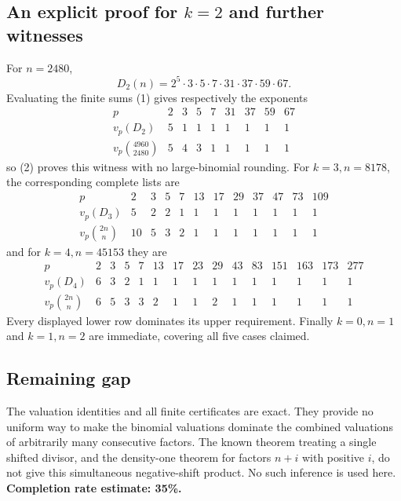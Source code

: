 \subsection*{An explicit proof for $k=2$ and further witnesses}
For $n=2480$,
\[
 D_2(n)=2^5\cdot3\cdot5\cdot7\cdot31\cdot37\cdot59\cdot67.
\]
Evaluating the finite sums (1) gives respectively the exponents
\[
 \begin{array}{c|rrrrrrrr}
 p&2&3&5&7&31&37&59&67\\\hline
 v_p(D_2)&5&1&1&1&1&1&1&1\\
 v_p\binom{4960}{2480}&5&4&3&1&1&1&1&1
 \end{array}
\]
so (2) proves this witness with no large-binomial rounding.
For $k=3,n=8178$, the corresponding complete lists are
\[
 \begin{array}{c|rrrrrrrrrrr}
 p&2&3&5&7&13&17&29&37&47&73&109\\\hline
 v_p(D_3)&5&2&2&1&1&1&1&1&1&1&1\\
 v_p\binom{2n}{n}&10&5&3&2&1&1&1&1&1&1&1
 \end{array}
\]
and for $k=4,n=45153$ they are
\[
 \begin{array}{c|rrrrrrrrrrrrrr}
 p&2&3&5&7&13&17&23&29&43&83&151&163&173&277\\\hline
 v_p(D_4)&6&3&2&1&1&1&1&1&1&1&1&1&1&1\\
 v_p\binom{2n}{n}&6&5&3&3&2&1&1&2&1&1&1&1&1&1
 \end{array}
\]
Every displayed lower row dominates its upper requirement. Finally $k=0,n=1$ and $k=1,n=2$ are immediate, covering all five cases claimed.

\subsection*{Remaining gap}
The valuation identities and all finite certificates are exact. They provide no uniform way to make the binomial valuations dominate the combined valuations of arbitrarily many consecutive factors. The known theorem treating a single shifted divisor, and the density-one theorem for factors $n+i$ with positive $i$, do not give this simultaneous negative-shift product. No such inference is used here.
\textbf{Completion rate estimate: 35\%.}
